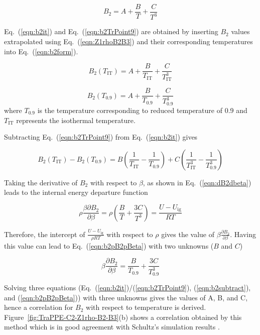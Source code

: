 \documentclass[5p,times]{elsarticle}
\begin{document}
\begin{equation}
B_2=A+\frac{B}{T}+\frac{C}{T^3} \label{eqn:b2form}
\end{equation}

Eq.~(\ref{eqn:b2it}) and Eq.~(\ref{eqn:b2TrPoint9}) are obtained by inserting $B_2$ values extrapolated using Eq.~(\ref{eqn:Z1rhoB2B3}) and their corresponding temperatures into Eq.~(\ref{eqn:b2form}). 

\begin{equation}
B_2(T_{\mathrm{IT}})=A+\frac{B}{T_{\mathrm{IT}}}+\frac{C}{T_{\mathrm{IT}}^3} \label{eqn:b2it}
\end{equation}

\begin{equation}
B_2(T_{0.9})=A+\frac{B}{T_{0.9}}+\frac{C}{T_{0.9}^3} \label{eqn:b2TrPoint9}
\end{equation}
where $T_{0.9}$ is the temperature corresponding to reduced temperature of 0.9 and $T_\mathrm{IT}$ represents the isothermal temperature. 

Subtracting Eq.~(\ref{eqn:b2TrPoint9}) from Eq.~(\ref{eqn:b2it}) gives


\begin{equation}
B_2(T_{\mathrm{IT}})-B_2(T_{0.9})=B \left( \frac{1}{T_{\mathrm{IT}}}-\frac{1}{T_{0.9}} \right) +C \left( \frac{1}{T_{\mathrm{IT}}^3}-\frac{1}{T_{0.9}^3} \right) \label{eqn:b2subtract}
\end{equation}

Taking the derivative of $B_2$ with respect to $\beta$, as shown in Eq.~(\ref{eqn:dB2dbeta}) leads to the internal energy departure function

\begin{equation}
\rho \frac{\beta \partial B_2}{\partial \beta}=\rho \left( \frac{B}{T}+\frac{3C}{T^3}\right)=\frac{U-U_\mathrm{ig}}{RT} \label{eqn:b2uDep}
\end{equation}

Therefore, the intercept of $\frac{U-U_\mathrm{ig}}{\rho RT}$ with respect to $\rho$ gives the value of $\beta \frac{\partial B_2}{\partial \beta}$. Having this value can lead to Eq.~(\ref{eqn:b2pB2pBeta}) with two unknowns ($B$ and $C$)

\begin{equation}
\beta \frac{\partial B_2}{\partial \beta}=\frac{B}{T_{0.9}}+\frac{3C}{T_{0.9}^3} \label{eqn:b2pB2pBeta}
\end{equation}

Solving three equations (Eq.~(\ref{eqn:b2it})/(\ref{eqn:b2TrPoint9}), (\ref{eqn:b2subtract}), and (\ref{eqn:b2pB2pBeta})) with three unknowns gives the values of A, B, and C, hence a correlation for $B_2$ with respect to temperature is derived. Figure~\ref{fig:TraPPE-C2-Z1rho-B2-B3}(b) shows a correlation obtained by this method which is in good agreement with Schultz's simulation results \cite{Schultz2010a}.
\end{document}
